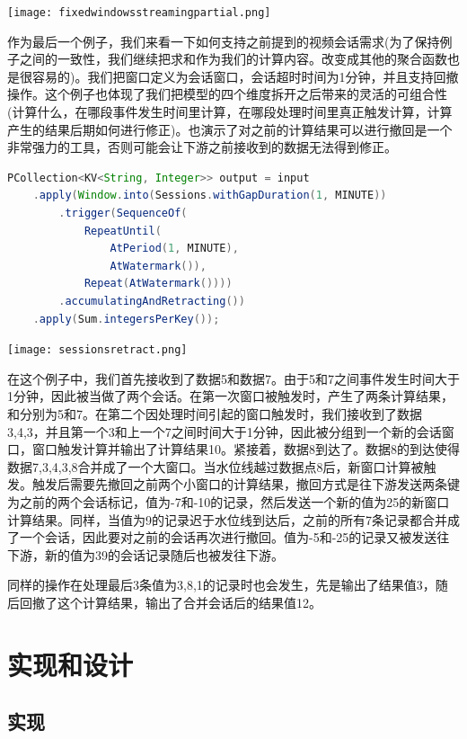 \documentclass[oneside]{ctexbook}
\begin{document}
\noindent \texttt{[image: fixedwindowsstreamingpartial.png]}

作为最后一个例子，我们来看一下如何支持之前提到的视频会话需求(为了保持例子之间的一致性，我们继续把求和作为我们的计算内容。改变成其他的聚合函数也是很容易的)。我们把窗口定义为会话窗口，会话超时时间为1分钟，并且支持回撤操作。这个例子也体现了我们把模型的四个维度拆开之后带来的灵活的可组合性(计算什么，在哪段事件发生时间里计算，在哪段处理时间里真正触发计算，计算产生的结果后期如何进行修正)。也演示了对之前的计算结果可以进行撤回是一个非常强力的工具，否则可能会让下游之前接收到的数据无法得到修正。

\begin{lstlisting}[language=java]
PCollection<KV<String, Integer>> output = input
    .apply(Window.into(Sessions.withGapDuration(1, MINUTE))
        .trigger(SequenceOf(
            RepeatUntil(
                AtPeriod(1, MINUTE),
                AtWatermark()),
            Repeat(AtWatermark())))
        .accumulatingAndRetracting())
    .apply(Sum.integersPerKey());
\end{lstlisting}

\noindent \texttt{[image: sessionsretract.png]}

在这个例子中，我们首先接收到了数据5和数据7。由于5和7之间事件发生时间大于1分钟，因此被当做了两个会话。在第一次窗口被触发时，产生了两条计算结果，和分别为5和7。在第二个因处理时间引起的窗口触发时，我们接收到了数据3,4,3，并且第一个3和上一个7之间时间大于1分钟，因此被分组到一个新的会话窗口，窗口触发计算并输出了计算结果10。紧接着，数据8到达了。数据8的到达使得数据7,3,4,3,8合并成了一个大窗口。当水位线越过数据点8后，新窗口计算被触发。触发后需要先撤回之前两个小窗口的计算结果，撤回方式是往下游发送两条键为之前的两个会话标记，值为-7和-10的记录，然后发送一个新的值为25的新窗口计算结果。同样，当值为9的记录迟于水位线到达后，之前的所有7条记录都合并成了一个会话，因此要对之前的会话再次进行撤回。值为-5和-25的记录又被发送往下游，新的值为39的会话记录随后也被发往下游。

同样的操作在处理最后3条值为3,8,1的记录时也会发生，先是输出了结果值3，随后回撤了这个计算结果，输出了合并会话后的结果值12。

\section{实现和设计}

\subsection{实现}
\end{document}
